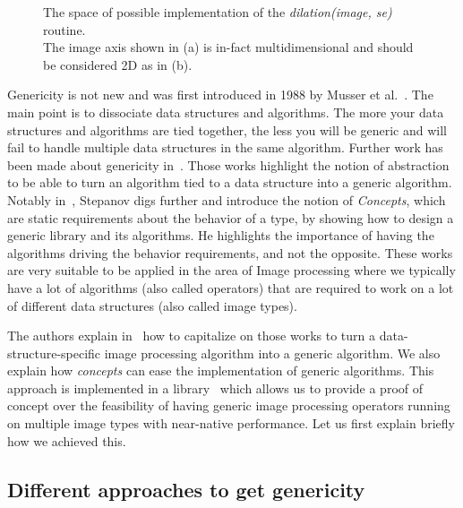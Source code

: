 \begin{figure}[htbp]
  \centering
  \subfloat[]{}
  \hfil
  \subfloat[]{}
  \caption{The space of possible implementation of the \emph{dilation(image, se)} routine.\\
    The image axis shown in (a) is in-fact multidimensional and should be considered 2D as in (b).}
  \label{fig:gen.espaceSAV}
\end{figure}

Genericity is not new and was first introduced in 1988 by Musser et al.~\parencite{musser.1988.generic}. The main point
is to dissociate data structures and algorithms. The more your data structures and algorithms are tied together, the
less you will be generic and will fail to handle multiple data structures in the same algorithm. Further work has been
made about genericity in~\parencite{musser.1994.algorithm,dehnert.1998.fundamentals}. Those works highlight the notion
of abstraction to be able to turn an algorithm tied to a data structure into a generic algorithm. Notably
in~\parencite{stepanov.2009.elements}, Stepanov digs further and introduce the notion of \emph{Concepts}, which are
static requirements about the behavior of a type, by showing how to design a generic library and its algorithms. He
highlights the importance of having the algorithms driving the behavior requirements, and not the opposite. These works
are very suitable to be applied in the area of Image processing where we typically have a lot of algorithms (also called
operators) that are required to work on a lot of different data structures (also called image types).

The authors explain in~\parencite{roynard.2019.rrpr} how to capitalize on those works to turn a data-structure-specific
image processing algorithm into a generic algorithm. We also explain how \emph{concepts} can ease the implementation of
generic algorithms. This approach is implemented in a library~\parencite{carlinet.2018.pylena} which allows us to
provide a proof of concept over the feasibility of having generic image processing operators running on multiple image
types with near-native performance. Let us first explain briefly how we achieved this.

\subsection{Different approaches to get genericity}
\label{subsec:different.approaches}

